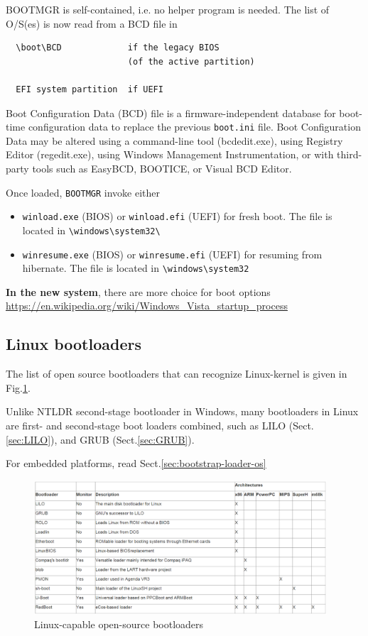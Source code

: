BOOTMGR is self-contained, i.e. no helper program is needed.
The list of O/S(es) is now read from a BCD file in 
\begin{verbatim}
  \boot\BCD             if the legacy BIOS 
                        (of the active partition)

  EFI system partition  if UEFI 
\end{verbatim}

Boot Configuration Data (BCD) file is a firmware-independent database for
boot-time configuration data to replace the previous \verb!boot.ini! file. Boot
Configuration Data may be altered using a command-line tool (bcdedit.exe), using
Registry Editor (regedit.exe), using Windows Management
Instrumentation, or with third-party tools such as EasyBCD, BOOTICE, or Visual
BCD Editor.
  
Once loaded, \verb!BOOTMGR! invoke either 
\begin{itemize}
    \item \verb!winload.exe! (BIOS) or \verb!winload.efi! (UEFI) for fresh
    boot. The file is located in \verb!\windows\system32\!
  
    \item \verb!winresume.exe! (BIOS) or \verb!winresume.efi! (UEFI) for
    resuming from hibernate. The file is located in \verb!\windows\system32!
  
\end{itemize}
  
{\bf In the new system}, there are more choice for boot options
\url{https://en.wikipedia.org/wiki/Windows_Vista_startup_process}


\subsection{Linux bootloaders}
\label{sec:bootloader-Linux}

The list of open source bootloaders that can recognize Linux-kernel is given in
Fig.\ref{fig:Linux-bootloaders}.

Unlike NTLDR second-stage bootloader in Windows, many bootloaders in Linux are 
first- and second-stage boot loaders combined, such as LILO
(Sect.\ref{sec:LILO}), and GRUB (Sect.\ref{sec:GRUB}).

For embedded platforms, read Sect.\ref{sec:bootstrap-loader-os}

\begin{figure}[hbt]
  \centerline{\includegraphics[height=5cm,
    angle=0]{./images/Linux-bootloaders.eps}}
\caption{Linux-capable open-source bootloaders}
\label{fig:Linux-bootloaders}
\end{figure}

